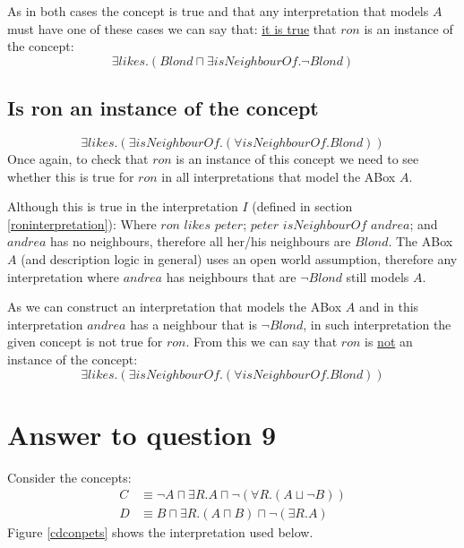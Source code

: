 \documentclass[a4paper,12pt]{article}
\begin{document}
As in both cases the concept is true and that any interpretation that models
$A$ must have one of these cases we can say that: \underline{it is true} that
$ron$ is an instance of the concept:
\begin{equation*}
\exists likes.(Blond \sqcap \exists isNeighbourOf. \neg Blond)
\end{equation*}

\subsection[For all]{Is ron an instance of the concept}
\begin{equation*}
\exists likes.(\exists isNeighbourOf.(\forall isNeighbourOf.Blond))
\end{equation*}
Once again, to check that $ron$ is an instance of this concept we need to see
whether this is true for $ron$ in all interpretations that model the ABox $A$.

Although this is true in the interpretation $I$ (defined in section
\ref{roninterpretation}):  Where $ron$ $likes$ $peter$; $peter$ $isNeighbourOf$
$andrea$; and $andrea$ has no neighbours, therefore all her/his neighbours are
$Blond$.  The ABox $A$ (and description logic in general) uses an open world
assumption, therefore any interpretation where $andrea$ has neighbours that are
$\neg Blond$ still models $A$.

As we can construct an interpretation that models the ABox $A$ and in this
interpretation $andrea$ has a neighbour that is $\neg Blond$, in such
interpretation the given concept is not true for $ron$.  From this we can say
that $ron$ is \underline{not} an instance of the concept:
\begin{equation*}
\exists likes.(\exists isNeighbourOf.(\forall isNeighbourOf.Blond))
\end{equation*}

\section[Question 9]{Answer to question 9}

Consider the concepts:
\begin{align*}
C &\equiv \neg A \sqcap \exists R.A \sqcap \neg(\forall R.(A \sqcup \neg B))\\
D &\equiv B \sqcap \exists R.(A \sqcap B) \sqcap \neg(\exists R.A)
\end{align*}
Figure \ref{cdconpets} shows the interpretation used below.
\end{document}
